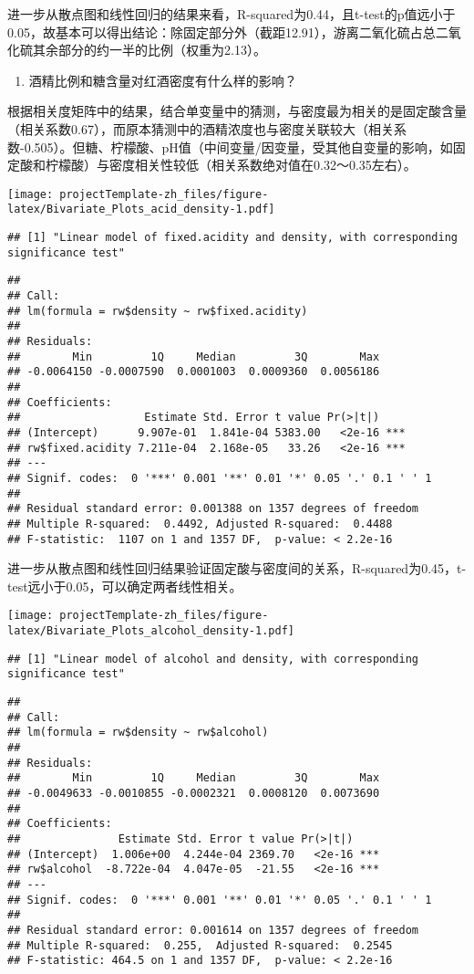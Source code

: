 \documentclass[]{article}
\providecommand{\tightlist}{%
  \setlength{\itemsep}{0pt}\setlength{\parskip}{0pt}}
\begin{document}
进一步从散点图和线性回归的结果来看，R-squared为0.44，且t-test的p值远小于0.05，故基本可以得出结论：除固定部分外（截距12.91），游离二氧化硫占总二氧化硫其余部分的约一半的比例（权重为2.13）。

\begin{enumerate}
\def\labelenumi{\arabic{enumi}.}
\setcounter{enumi}{1}
\tightlist
\item
  酒精比例和糖含量对红酒密度有什么样的影响？
\end{enumerate}

根据相关度矩阵中的结果，结合单变量中的猜测，与密度最为相关的是固定酸含量（相关系数0.67），而原本猜测中的酒精浓度也与密度关联较大（相关系数-0.505）。但糖、柠檬酸、pH值（中间变量/因变量，受其他自变量的影响，如固定酸和柠檬酸）与密度相关性较低（相关系数绝对值在0.32～0.35左右）。

\texttt{[image: projectTemplate-zh\_files/figure-latex/Bivariate\_Plots\_acid\_density-1.pdf]}

\begin{verbatim}
## [1] "Linear model of fixed.acidity and density, with corresponding significance test"
\end{verbatim}

\begin{verbatim}
## 
## Call:
## lm(formula = rw$density ~ rw$fixed.acidity)
## 
## Residuals:
##        Min         1Q     Median         3Q        Max 
## -0.0064150 -0.0007590  0.0001003  0.0009360  0.0056186 
## 
## Coefficients:
##                   Estimate Std. Error t value Pr(>|t|)    
## (Intercept)      9.907e-01  1.841e-04 5383.00   <2e-16 ***
## rw$fixed.acidity 7.211e-04  2.168e-05   33.26   <2e-16 ***
## ---
## Signif. codes:  0 '***' 0.001 '**' 0.01 '*' 0.05 '.' 0.1 ' ' 1
## 
## Residual standard error: 0.001388 on 1357 degrees of freedom
## Multiple R-squared:  0.4492, Adjusted R-squared:  0.4488 
## F-statistic:  1107 on 1 and 1357 DF,  p-value: < 2.2e-16
\end{verbatim}

进一步从散点图和线性回归结果验证固定酸与密度间的关系，R-squared为0.45，t-test远小于0.05，可以确定两者线性相关。

\texttt{[image: projectTemplate-zh\_files/figure-latex/Bivariate\_Plots\_alcohol\_density-1.pdf]}

\begin{verbatim}
## [1] "Linear model of alcohol and density, with corresponding significance test"
\end{verbatim}

\begin{verbatim}
## 
## Call:
## lm(formula = rw$density ~ rw$alcohol)
## 
## Residuals:
##        Min         1Q     Median         3Q        Max 
## -0.0049633 -0.0010855 -0.0002321  0.0008120  0.0073690 
## 
## Coefficients:
##               Estimate Std. Error t value Pr(>|t|)    
## (Intercept)  1.006e+00  4.244e-04 2369.70   <2e-16 ***
## rw$alcohol  -8.722e-04  4.047e-05  -21.55   <2e-16 ***
## ---
## Signif. codes:  0 '***' 0.001 '**' 0.01 '*' 0.05 '.' 0.1 ' ' 1
## 
## Residual standard error: 0.001614 on 1357 degrees of freedom
## Multiple R-squared:  0.255,  Adjusted R-squared:  0.2545 
## F-statistic: 464.5 on 1 and 1357 DF,  p-value: < 2.2e-16
\end{verbatim}
\end{document}
